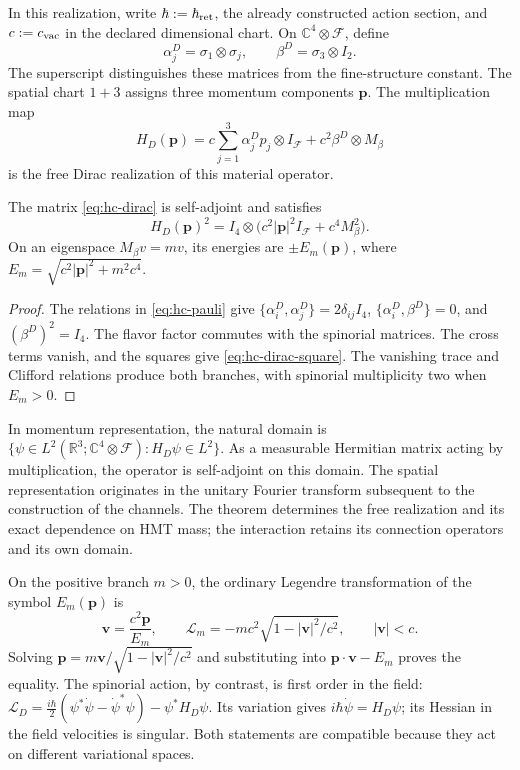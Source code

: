 In this realization, write \(\hbar:=\hbar_{\rm ret}\),
the already constructed action section, and \(c:=c_{\rm vac}\) in the
declared dimensional chart. On \(\mathbb C^4\otimes\mathcal F\), define
\[
 \alpha_j^{D}=\sigma_1\otimes\sigma_j,\qquad
 \beta^D=\sigma_3\otimes I_2.
\]
The superscript distinguishes these matrices from the fine-structure constant.
The spatial chart \(1+3\) assigns three momentum components
\(\mathbf p\). The multiplication map
\begin{equation}
 H_D(\mathbf p)
 =c\sum_{j=1}^3\alpha_j^Dp_j\otimes I_{\mathcal F}
 +c^2\beta^D\otimes M_\beta
 \label{eq:hc-dirac}
\end{equation}
is the free Dirac realization of this material operator.

\begin{theorem}
\label{thm:hc-dirac-square}
The matrix \eqref{eq:hc-dirac} is self-adjoint and satisfies
\begin{equation}
 H_D(\mathbf p)^2
 =I_4\otimes\bigl(c^2|\mathbf p|^2I_{\mathcal F}
 +c^4M_\beta^2\bigr).
 \label{eq:hc-dirac-square}
\end{equation}
On an eigenspace \(M_\beta v=m v\), its energies are
\(\pm E_m(\mathbf p)\), where
\(E_m=\sqrt{c^2|\mathbf p|^2+m^2c^4}\).
\end{theorem}
\begin{proof}
The relations in \eqref{eq:hc-pauli} give
\(\{\alpha_i^D,\alpha_j^D\}=2\delta_{ij}I_4\),
\(\{\alpha_i^D,\beta^D\}=0\), and \((\beta^D)^2=I_4\).
The flavor factor commutes with the spinorial matrices.
The cross terms vanish, and the squares give
\eqref{eq:hc-dirac-square}. The vanishing trace and Clifford relations
produce both branches, with spinorial multiplicity two when \(E_m>0\).
\end{proof}

In momentum representation, the natural domain is
\(\{\psi\in L^2(\mathbb R^3;\mathbb C^4\otimes\mathcal F):
H_D\psi\in L^2\}\). As a measurable Hermitian matrix acting
by multiplication, the operator is self-adjoint on this domain. The
spatial representation originates in the unitary Fourier transform
subsequent to the construction of the channels. The theorem determines the free
realization and its exact dependence on HMT mass; the interaction retains its
connection operators and its own domain.

On the positive branch \(m>0\), the ordinary Legendre transformation
of the symbol \(E_m(\mathbf p)\) is
\[
 \mathbf v=\frac{c^2\mathbf p}{E_m},\qquad
 \mathcal L_m=-mc^2\sqrt{1-|\mathbf v|^2/c^2},
 \qquad |\mathbf v|<c.
\]
Solving \(\mathbf p=m\mathbf v/\sqrt{1-|\mathbf v|^2/c^2}\)
and substituting into \(\mathbf p\cdot\mathbf v-E_m\) proves the
equality. The spinorial action, by contrast, is first order in the field:
\(\mathcal L_D=\frac{i\hbar}{2}(\psi^*\dot\psi-\dot\psi^*\psi)
-\psi^*H_D\psi\). Its variation gives
\(i\hbar\dot\psi=H_D\psi\); its Hessian in the field velocities
is singular. Both statements are compatible because they act on
different variational spaces.

